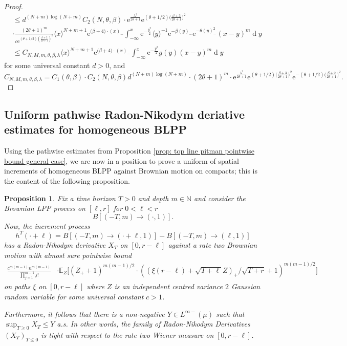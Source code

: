 \documentclass[11pt, reqno]{amsart}
\numberwithin{equation}{section}
\newcounter{dummy} \numberwithin{dummy}{section}
\newtheorem{proposition}[dummy]{Proposition}
\newcommand{\N}{\ensuremath{\mathbb{N}}}
\newcommand{\diff}{\ensuremath{\operatorname{d}\!}}
\begin{document}
\begin{proof}
\begin{align*}
         &\le d^{(N+m)\log(N+m)}C_2(N, \theta, \beta)\cdot\mathrm{e}^{\frac{\lambda^2}{2\theta + 1}} \mathrm{e}^{(\theta + 1/2)\big(\frac{\beta+3}{2\theta +1}\big)^2}\\
         & \cdot\frac{(2\theta+1)^m}{c\mathrm{e}^{(\theta + 1/2){(\frac{\beta+2}{2\theta +1})^2}}} \langle x\rangle ^{N+m+1}\mathrm{e}^{\big(\beta + 4\big)\cdot (x)_-} \displaystyle\int^x_{-\infty}\mathrm{e}^{-\frac{y^2}{2}}\langle y \rangle^{-1} \mathrm{e}^{-\beta (y)_-}\mathrm{e}^{-\theta(y)^2_-}(x-y)^m\diff y\\
         &\le C_{N,M, m, \theta, \beta, \lambda}  \langle x\rangle ^{N+m+1}\mathrm{e}^{\big(\beta+4\big)\cdot (x)_-} \displaystyle\int^x_{-\infty}\mathrm{e}^{-\frac{y^2}{2}}g(y)(x-y)^m\diff y
    \end{align*}   
    for some universal constant $d>0$, and  
    \[C_{N,M, m, \theta, \beta, \lambda} = C_1(\theta, \beta) \cdot C_2(N, \theta, \beta) d^{(N+m)\log(N+m)}\cdot(2\theta+1)^m\cdot \mathrm{e}^{\frac{\lambda^2}{2\theta + 1}} \mathrm{e}^{(\theta + 1/2)\big(\frac{\beta+3}{2\theta +1}\big)^2} \mathrm{e}^{-(\theta + 1/2)\big(\frac{\beta+2}{2\theta +1}\big)^2}.
    \]
\end{proof}

\subsection{Uniform pathwise Radon-Nikodym deriative estimates for homogeneous BLPP}\label{sec: uniform path blpp hom}
Using the pathwise estimates from Proposition \ref{prop: top line pitman pointwise bound general case}, we are now in a position to prove a uniform of spatial increments of homogeneous BLPP against Brownian motion on compacts; this is the content of the following proposition.

\begin{proposition}\label{prop: uniform pathwise est blpp}
Fix a time horizon $T > 0$ and depth $m\in \N$ and consider the Brownian LPP process on $[\ell,r]$ for $0<\ell<r$
\[
B[(-T, m)\rightarrow (\cdot, 1)].
\]
Now, the increment process 
\[
h^T(\cdot+\ell) = B[(-T, m)\rightarrow (\cdot+\ell, 1)]-B[(-T, m)\rightarrow (\ell, 1)]
\]
 has a Radon-Nikodym derivative $X_T$ on $[0,r-\ell]$ against a rate two Brownian motion with almost sure pointwise bound 
    \begin{equation*}
    \begin{array}{cc}
    \frac{c^{m(m-1)}n^{m(m-1)}}{\prod_{j=1}^{m-1}j!}&\cdot \mathbb{E}_{Z}\Bigg[(Z_+ +1)^{m(m-1)/2}\cdot ((\xi(r-\ell)+\sqrt{T+\ell}Z)_+/\sqrt{T+r}+1)^{m(m-1)/2}\Bigg]
    \end{array}
\end{equation*}
on paths $\xi$ on $[0,r-\ell]$ where $Z$ is an independent centred variance $2$ Gaussian random variable for some universal constant $c>1$.

Furthermore, it follows that there is a non-negative $Y\in L^{\infty-}(\mu)$ such that $\sup_{T\ge 0} X_T \le Y$ a.s. In other words, the family of Radon-Nikodym Derivatives $(X_T)_{T\le 0}$ is tight with respect to the rate two Wiener measure on $[0,r-\ell]$.
\end{proposition}
\end{document}
